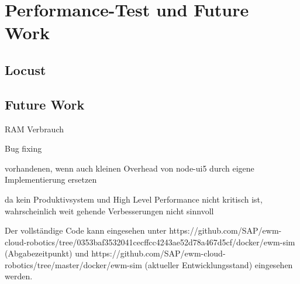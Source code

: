 \chapter{Performance-Test und Future Work}

\section{Locust}

\section{Future Work}
RAM Verbrauch

Bug fixing

vorhandenen, wenn auch kleinen Overhead von node-ui5 durch eigene Implementierung ersetzen

da kein Produktivsystem und High Level Performance nicht kritisch ist, wahrscheinlich weit gehende Verbesserungen nicht sinnvoll

Der vollständige Code kann eingesehen unter https://github.com/SAP/ewm-cloud-robotics/tree/0353baf3532041cecffcc4243ae52d78a467d5cf/docker/ewm-sim (Abgabezeitpunkt) und https://github.com/SAP/ewm-cloud-robotics/tree/master/docker/ewm-sim (aktueller Entwicklungsstand) eingesehen werden.
